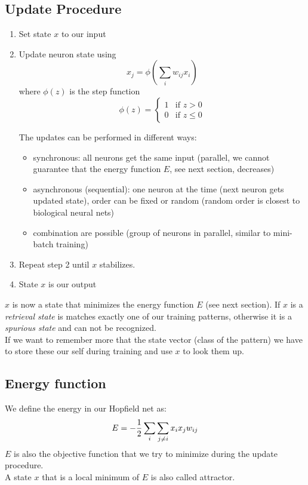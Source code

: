 \subsection{Update Procedure}
\begin{enumerate}
\item Set state $x$ to our input
\item Update neuron state using
	$$x_j = \phi\left(\sum_i w_{ij} x_i \right)$$
	where $\phi(z)$ is the step function
	\begin{equation}
	\phi(z) = \begin{cases}
		1 & \text{if } z > 0\\
		0 & \text{if } z \leq 0
	\end{cases}
	\end{equation}

	The updates can be performed in different ways:
	\begin{itemize}
	\item synchronous: all neurons get the same input (parallel, we cannot guarantee that the energy function $E$, see next section, decreases)
	\item asynchronous (sequential): one neuron at the time (next neuron gets updated state), order can be fixed or random (random order is closest to biological neural nets)
	\item combination are possible (group of neurons in parallel, similar to mini-batch training)
	\end{itemize}
\item Repeat step 2 until $x$ stabilizes.
\item State $x$ is our output
\end{enumerate}

$x$ is now a state that minimizes the energy function $E$ (see next section). If $x$ is a \emph{retrieval state} is matches exactly one of our training patterns, otherwise it is a \emph{spurious state} and can not be recognized.\\
If we want to remember more that the state vector (\eg class of the pattern) we have to store these our self during training and use $x$ to look them up.

\subsection{Energy function}%
We define the energy in our Hopfield net as:
\begin{equation}
E = -\frac{1}{2} \sum_i \sum_{j\neq i} x_i x_j w_{ij}
\end{equation}
$E$ is also the objective function that we try to minimize during the update procedure.\\
A state $x$ that is a local minimum of $E$ is also called attractor.

